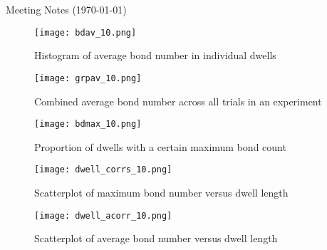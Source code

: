 \documentclass{article}
\newcommand{\tn}{\textnormal}
\begin{document}
\pagestyle{plain}

\begin{center}
  {\Large Meeting Notes (\today)}
\end{center}


\begin{figure}[h]
  \centering
  \texttt{[image: bdav\_10.png]}
  \caption{Histogram of average bond number in individual dwells}
  \label{fig:bd-av-10}
\end{figure}

\begin{figure}[h]
  \centering
  \texttt{[image: grpav\_10.png]}
  \caption{Combined average bond number across all trials in an experiment}
  \label{fig:grp-av-10}
\end{figure}

\begin{figure}[h]
  \centering
  \texttt{[image: bdmax\_10.png]}
  \caption{Proportion of dwells with a certain maximum bond count}
  \label{fig:dwell-corrs-10}
\end{figure}

\begin{figure}[h]
  \centering
  \texttt{[image: dwell\_corrs\_10.png]}
  \caption{Scatterplot of maximum bond number versus dwell length}
  \label{fig:dwell-corrs-10}
\end{figure}

\begin{figure}[h]
  \centering
  \texttt{[image: dwell\_acorr\_10.png]}
  \caption{Scatterplot of average bond number versus dwell length}
  \label{fig:dwell-corrs-10}
\end{figure}
\end{document}
